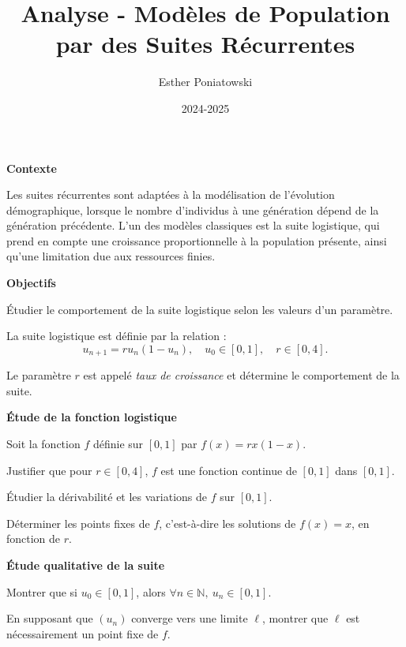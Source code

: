 \documentclass[10pt,a4paper]{article}
\title{Analyse - Modèles de Population par des Suites Récurrentes}
\author{Esther Poniatowski}
\date{2024-2025}
\begin{document}
\textbf{Contexte}

Les suites récurrentes sont adaptées à  la modélisation de l'évolution démographique, lorsque le
nombre d'individus à une génération dépend de la génération précédente. L'un des modèles classiques
est la suite logistique, qui prend en compte une croissance proportionnelle à la population
présente, ainsi qu'une limitation due aux ressources finies.

\bigskip
\textbf{Objectifs}

Étudier le comportement de la suite logistique selon les valeurs d'un paramètre.

\bigskip
La suite logistique est définie par la relation :
\[
u_{n+1} = r u_n (1 - u_n), \quad u_0 \in [0,1], \quad r \in [0,4].
\]

Le paramètre \( r \) est appelé \emph{taux de croissance} et détermine le comportement de la suite.

\vspace{0.5cm}
\textbf{Étude de la fonction logistique}

Soit la fonction \( f \) définie sur \( [0,1] \) par \( f(x) = r x (1 - x) \).

\q Justifier que pour \( r \in [0,4] \), \( f \) est une fonction continue de \( [0,1] \) dans \(
[0,1] \).

\q Étudier la dérivabilité et les variations de \( f \) sur \( [0,1] \).

\q Déterminer les points fixes de \( f \), c'est-à-dire les solutions de \( f(x) = x \), en fonction
de \( r \).

\vspace{0.5cm}
\textbf{Étude qualitative de la suite}

\q Montrer que si \( u_0 \in [0,1] \), alors \( \forall n \in \mathbb{N},\ u_n \in [0,1] \).

\q En supposant que \( (u_n) \) converge vers une limite \( \ell \), montrer que \( \ell \) est
nécessairement un point fixe de \( f \).
\end{document}
